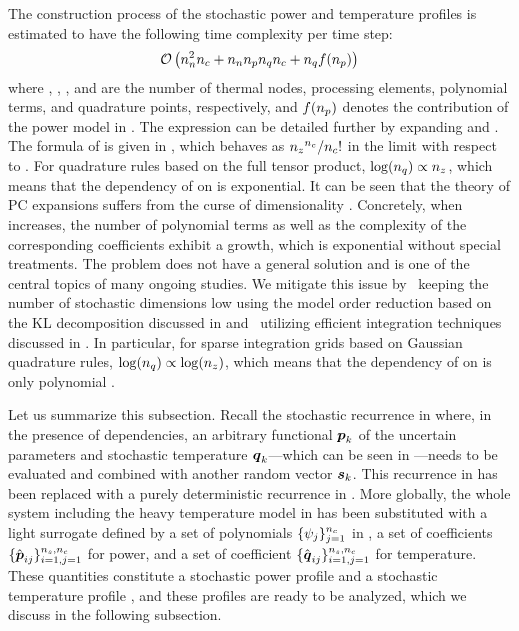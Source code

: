 The construction process of the stochastic power and temperature profiles is
estimated to have the following time complexity per time step:
\[
  \mathcal{O}\left(n_n^2 {n_{c}} + {n_{n}} {n_{p}} {n_{q}} {n_{c}} + {n_{q}} f({n_{p}})\right)
\]
where \nn, \np, \nc, and \nq are the number of thermal nodes, processing
elements, polynomial terms, and quadrature points, respectively, and $f({n_{p}})$
denotes the contribution of the power model in . The
expression can be detailed further by expanding \nc and \nq. The formula of \nc
is given in , which behaves as ${n_{z}}^{n_{c}} / {n_{c}}!$
in the limit with respect to \nz. For quadrature rules based on the full tensor
product, $\log({n_{q}}) \propto {n_{z}}$, which means that the dependency of \nq on \nz
is exponential. It can be seen that the theory of \ac{PC} expansions suffers
from the curse of dimensionality \cite{eldred2008, xiu2010}. Concretely, when
\nz increases, the number of polynomial terms as well as the complexity of the
corresponding coefficients exhibit a growth, which is exponential without
special treatments. The problem does not have a general solution and is one of
the central topics of many ongoing studies. We mitigate this issue by
\one~keeping the number of stochastic dimensions low using the model order
reduction based on the \ac{KL} decomposition discussed in
 and \two~utilizing efficient integration
techniques discussed in . In particular, for sparse
integration grids based on Gaussian quadrature rules, $\log({n_{q}}) \propto
\log({n_{z}})$, which means that the dependency of \nq on \nz is only polynomial
\cite{heiss2008}.

Let us summarize this subsection. Recall the stochastic recurrence in
 where, in the presence of dependencies, an
arbitrary functional $\boldsymbol{p}_k$ of the uncertain parameters \vu and stochastic
temperature $\boldsymbol{q}_k$---which can be seen in ---needs to
be evaluated and combined with another random vector $\boldsymbol{s}_k$. This recurrence in
 has been replaced with a purely deterministic
recurrence in . More globally, the whole system including
the heavy temperature model in  has been
substituted with a light surrogate defined by a set of polynomials $\{ \psi_j
\}_{j = 1}^{n_{c}}$ in \vz, a set of coefficients $\{ \hat{\boldsymbol{p}}_{ij} \}_{i = 1, j =
1}^{{n_{s}}, {n_{c}}}$ for power, and a set of coefficient $\{ \hat{\boldsymbol{q}}_{ij} \}_{i = 1,
j = 1}^{{n_{s}}, {n_{c}}}$ for temperature. These quantities constitute a stochastic
power profile \mp and a stochastic temperature profile \mq, and these profiles
are ready to be analyzed, which we discuss in the following subsection.

